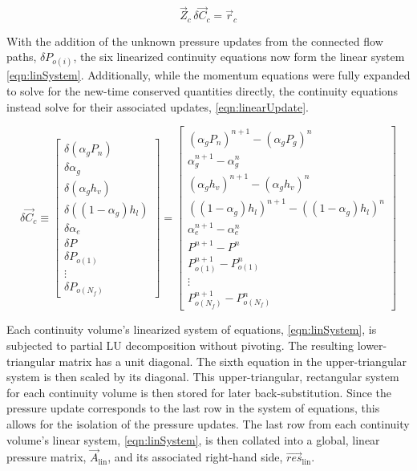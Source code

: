 \begin{equation}
\label{eqn:linSystem}
\vec{Z}_{c}\, \delta \vec{C}_{c} = \vec{r}_{c}
\end{equation}

With the addition of the unknown pressure updates from the connected flow paths, $\delta P_{o(i)}$,  the six linearized continuity equations now form the linear system \eqref{eqn:linSystem}.
Additionally, while the momentum equations were fully expanded to solve for the new-time conserved quantities directly, the continuity equations instead solve for their associated updates, \eqref{eqn:linearUpdate}.

\begin{equation}
\label{eqn:linearUpdate}
\delta \vec{C}_{c} \equiv 
\begin{bmatrix}
\delta ( \alpha_{g} P_{n} ) \\
\delta \alpha_{g} \\
\delta ( \alpha_{g} h_v ) \\
\delta ( (1 - \alpha_{g} ) h_l ) \\
\delta \alpha_{e} \\
\delta P \\ 
\delta P_{o(1)} \\
\vdots \\
\delta P_{o(N_{f})}
\end{bmatrix}
=
\begin{bmatrix}
( \alpha_{g} P_{n})^{n+1} - (\alpha_{g} P_{g} )^{n} \\
\alpha^{n+1}_{g} - \alpha^{n}_{g} \\
( \alpha_{g} h_{v} )^{n+1} - ( \alpha_{g} h_{v} )^{n} \\
( ( 1 - \alpha_{g} ) h_{l} )^{n+1} - ( ( 1 - \alpha_{g} ) h_{l} )^{n} \\
\alpha^{n+1}_{e} - \alpha^{n}_{e} \\
 P^{n+1} - P^{n} \\
 P_{o(1)}^{n+1} - P_{o(1)}^{n} \\
 \vdots \\
 P_{o(N_{f})}^{n+1} - P_{o(N_{f})}^{n}
\end{bmatrix}
\end{equation}

Each continuity volume's linearized system of equations, \eqref{eqn:linSystem}, is subjected to partial LU decomposition without pivoting.
The resulting lower-triangular matrix has a unit diagonal.
The sixth equation in the upper-triangular system is then scaled by its diagonal.
This upper-triangular, rectangular system for each continuity volume is then stored for later back-substitution.
Since the pressure update corresponds to the last row in the system of equations, this allows for the isolation of the pressure updates.
The last row from each continuity volume's linear system, \eqref{eqn:linSystem}, is then collated into a global, linear pressure matrix, $\vec{A}_{\text{lin}}$, and its associated right-hand side, $\vec{res}_{\text{lin}}$.

